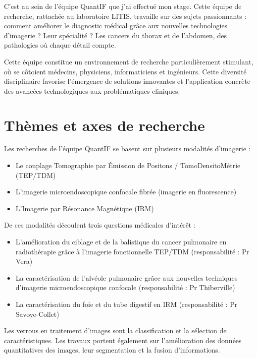 \documentclass[11pt,a4paper]{report}
\begin{document}
C'est au sein de l'équipe QuantIF que j'ai effectué mon stage. Cette équipe de recherche, rattachée au laboratoire LITIS, travaille sur des sujets passionnants : comment améliorer le diagnostic médical grâce aux nouvelles technologies d'imagerie ? Leur spécialité ? Les cancers du thorax et de l'abdomen, des pathologies où chaque détail compte.

Cette équipe constitue un environnement de recherche particulièrement stimulant, où se côtoient médecins, physiciens, informaticiens et ingénieurs. Cette diversité disciplinaire favorise l'émergence de solutions innovantes et l'application concrète des avancées technologiques aux problématiques cliniques.

\section{Thèmes et axes de recherche}

Les recherches de l'équipe QuantIF se basent sur plusieurs modalités d'imagerie :

\begin{itemize}
\item Le couplage Tomographie par Émission de Positons / TomoDensitoMétrie (TEP/TDM)
\item L'imagerie microendoscopique confocale fibrée (imagerie en fluorescence)
\item L'Imagerie par Résonance Magnétique (IRM)
\end{itemize}

De ces modalités découlent trois questions médicales d'intérêt :

\begin{itemize}
\item L'amélioration du ciblage et de la balistique du cancer pulmonaire en radiothérapie grâce à l'imagerie fonctionnelle TEP/TDM (responsabilité : Pr Vera)
\item La caractérisation de l'alvéole pulmonaire grâce aux nouvelles techniques d'imagerie microendoscopique confocale (responsabilité : Pr Thiberville)
\item La caractérisation du foie et du tube digestif en IRM (responsabilité : Pr Savoye-Collet)
\end{itemize}

Les verrous en traitement d'images sont la classification et la sélection de caractéristiques. Les travaux portent également sur l'amélioration des données quantitatives des images, leur segmentation et la fusion d'informations.
\end{document}
